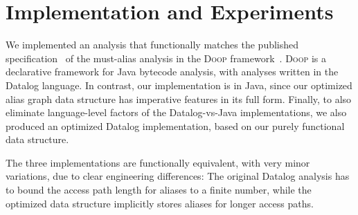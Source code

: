 



\section{Implementation and Experiments}
\label{sec:experiments}

We implemented an analysis that functionally matches the published
specification~\cite{soap/Balatsouras17} of the must-alias analysis in the
\textsc{Doop} framework~\cite{oopsla:2009:Bravenboer}. \textsc{Doop} is
a declarative framework for Java bytecode analysis, with analyses
written in the Datalog language. In contrast, our implementation is in
Java, since our optimized alias graph data structure has imperative
features in its full form. Finally, to also eliminate language-level
factors of the Datalog-vs-Java implementations, we also produced an
optimized Datalog implementation, based on our purely functional data
structure.

The three
implementations are functionally equivalent, with very minor
variations, due to clear engineering differences: The
original Datalog analysis has to bound the access path length for aliases to a
finite number, while the optimized data structure implicitly stores
aliases for longer access paths.

